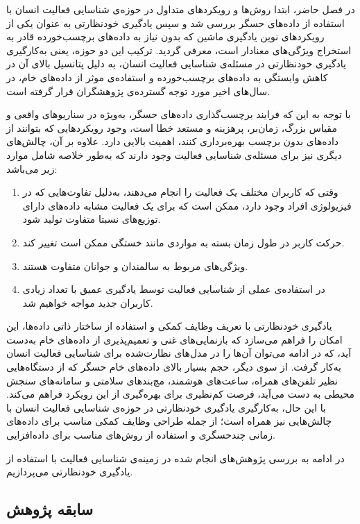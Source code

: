 در فصل حاضر، ابتدا روش‌ها و رویکردهای متداول در حوزه‌ی شناسایی فعالیت انسان با استفاده از داده‌های حسگر بررسی شد و سپس یادگیری خودنظارتی به عنوان یکی از رویکردهای نوین یادگیری ماشین که بدون نیاز به داده‌های برچسب‌خورده قادر به استخراج ویژگی‌های معنادار است، معرفی گردید. ترکیب این دو حوزه، یعنی به‌کارگیری یادگیری خودنظارتی در مسئله‌ی شناسایی فعالیت انسان، به دلیل پتانسیل بالای آن در کاهش وابستگی به داده‌های برچسب‌خورده و استفاده‌ی موثر از داده‌های خام، در سال‌های اخیر مورد توجه گسترده‌ی پژوهشگران قرار گرفته است.

با توجه به این که فرایند برچسب‌گذاری داده‌های حسگر، به‌ویژه در سناریوهای واقعی و مقیاس بزرگ، زمان‌بر، پرهزینه و مستعد خطا است، وجود رویکردهایی که بتوانند از داده‌های بدون برچسب بهره‌برداری کنند، اهمیت بالایی دارد. علاوه بر آن، چالش‌های دیگری نیز برای مسئله‌ی شناسایی فعالیت وجود دارند که به‌طور خلاصه شامل موارد زیر می‌باشد:
\begin{enumerate}
    \item وقتی که کاربران مختلف یک فعالیت را انجام می‌دهند، به‌دلیل تفاوت‌هایی که در فیزیولوژی افراد وجود دارد، ممکن است که برای یک فعالیت مشابه داده‌های دارای توزیع‌های نسبتا متفاوت تولید شود.
    \item حرکت کاربر در طول زمان بسته به مواردی مانند خستگی ممکن است تغییر کند.
    \item ویژگی‌های مربوط به سالمندان و جوانان متفاوت هستند.
    \item در استفاده‌ی عملی از شناسایی فعالیت توسط یادگیری عمیق با تعداد زیادی کاربران جدید مواجه خواهیم شد.
\end{enumerate}
یادگیری خودنظارتی با تعریف وظایف کمکی و استفاده از ساختار ذاتی داده‌ها، این امکان را فراهم می‌سازد که بازنمایی‌های غنی و تعمیم‌پذیری از داده‌های خام به‌دست آید، که در ادامه می‌توان آن‌ها را در مدل‌های نظارت‌شده برای شناسایی فعالیت انسان به‌کار گرفت. از سوی دیگر، حجم بسیار بالای داده‌های خام حسگر که از دستگاه‌هایی نظیر تلفن‌های همراه، ساعت‌های هوشمند، مچ‌بندهای سلامتی و سامانه‌های سنجش محیطی به دست می‌آید، فرصت کم‌نظیری برای بهره‌گیری از این رویکرد فراهم می‌کند. با این حال، به‌کارگیری یادگیری خودنظارتی در حوزه‌ی شناسایی فعالیت انسان با چالش‌هایی نیز همراه است؛ از جمله طراحی وظایف کمکی مناسب برای داده‌های زمانی چندحسگری و استفاده از روش‌های مناسب برای داده‌افزایی.

در ادامه به بررسی پژوهش‌های انجام شده در زمینه‌ی شناسایی فعالیت با استفاده از یادگیری خودنظارتی می‌پردازیم.

\subsection{سابقه پژوهش}

